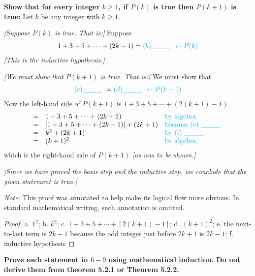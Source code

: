 \documentclass[14pt]{extarticle}
\newcommand{\fbl}{\underline{\hspace{1cm}}\,\,}
\newcommand{\from}{\leftarrow}
\newcommand{\cy}{\color{cyan}}
\begin{document}
{\bf Show that for every integer $k \geq 1$, if $P(k)$ is true then $P(k+1)$ is true:} Let $k$ be any integer with $k \geq 1$. 

{\it [Suppose $P(k)$ is true. That is:]} Suppose 
\[
1 + 3 + 5 + \cdots + (2k - 1) = {\cy (b) \fbl \from P(k)}
\]
{\it [This is the inductive hypothesis.]} 

{\it [We must show that $P(k + 1)$ is true. That is:]} We must show that 
\[
{\cy (c) \fbl} = {\cy (d) \fbl \from P(k + 1)}
\]
Now the left-hand side of $P(k + 1)$ is $1 + 3 + 5 + \cdots + (2(k + 1) - 1)$ 
\[
\begin{array}{lll}
= & 1 + 3 + 5 + \cdots + (2k + 1) & \text{\cy by algebra} \\
= & [1 + 3 + 5 + \cdots + (2k - 1)] + (2k+1) & \text{\cy because (e) \fbl} \\
= & k^2 + (2k+1) & \text{\cy by (f) \fbl} \\
= & (k + 1)^2 & \text{\cy by algebra,}
\end{array}
\]
which is the right-hand side of $P(k+1)$ {\it [as was to be shown.]}

{\it [Since we have proved the basis step and the inductive step, we conclude that the given statement is true.]}

{\it Note:} This proof was annotated to help make its logical flow more obvious. In standard mathematical writing, such annotation is omitted.

\begin{proof}
a. $1^2$; b. $k^2$; c. $1 + 3 + 5 + \cdots + [2(k + 1) - 1]$; d. $(k + 1)^2$; e. the next-to-last term is $2k-1$ because the odd integer just before $2k + 1$ is $2k - 1$; f. inductive hypothesis
\end{proof}

{\bf\cy Prove each statement in $6-9$ using mathematical induction. Do not derive them from theorem 5.2.1 or Theorem 5.2.2.}
\end{document}
